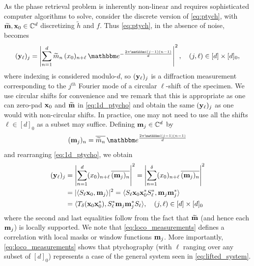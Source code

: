 As the phase retrieval problem is inherently non-linear and requires sophisticated computer algorithms to solve, consider the discrete version of \eqref{eq:ptych}, with $\widetilde{\mathbf m}, \mathbf x_0 \in \mathbb{C}^d$ discretizing $\widetilde{h}$ and $f$.  Thus \eqref{eq:ptych}, in the absence of noise, becomes 
%
\begin{equation}
    (\y_\ell)_j = \left \vert \sum_{n=1}^d \widetilde m_n \, (x_0)_{n+\ell} \,
      \mathbbm e^{-\frac{2\pi \mathbbm i (j-1) (n-1)}d} 
      \right \vert^2, \quad (j,\ell) \in [d] \times  
      [d]_0, 
  \label{eq:1d_ptycho}
\end{equation}
%
where indexing is
considered modulo-$d$, so $(\mathbf y_\ell)_j$
is a diffraction measurement corresponding to the $j^{th}$ Fourier mode
of a circular $\ell$-shift of the specimen. We use circular shifts for convenience and we remark that this is appropriate as one can zero-pad $\mathbf x_0$ and $\widetilde{\mathbf m}$  in \eqref{eq:1d_ptycho} and obtain the same $(\mathbf y_\ell)_j$ as one would with non-circular shifts. In practice, one may not need to use all the shifts $\ell \in [d]_0$ as a subset may suffice.  Defining $\mathbf m_j \in \mathbb{C}^d$ by \begin{equation} (\m_j)_n = \overline{\widetilde m_n} \, \mathbbm e^{\frac{2\pi \mathbbm i (j-1) (n-1)}d} \label{eq:ptychm} \end{equation} and rearranging \eqref{eq:1d_ptycho}, we obtain
\begin{align}
    (\y_\ell)_j &= \left \vert \sum_{n=1}^d (x_0)_{n+\ell} \, \overline{(\m_j)_n} \right \vert^2 \label{eq:loco_measurements} %
        = \left \vert \sum_{n=1}^\delta (x_0)_{n+\ell} \, \overline{(\m_j)_n} \right \vert^2 \\
        &= \lvert \langle S_\ell \x_0, \m_j \rangle \rvert^2 \notag %
       = \langle S_\ell \x_0 \x_0^* S_\ell^*, \m_j \m_j^* \rangle \notag\\
        &= \langle T_\delta(\x_0 \x_0^*), S_\ell^* \m_j \m_j^* S_\ell \rangle, \quad (j, \ell) \in [d] \times [d]_0 \notag
\end{align}
%
where the second and last equalities follow from the fact that $\widetilde {\mathbf m}$ (and hence each $\mathbf m_j$) is locally supported.  %
We note that \eqref{eq:loco_measurements}
defines a correlation with local masks or window functions
$\mathbf m_j$.  More importantly, \eqref{eq:loco_measurements} shows that ptychography (with $\ell$ ranging over any subset of $[d]_0$) represents a case of the general system seen in \eqref{eq:lifted_system}.

